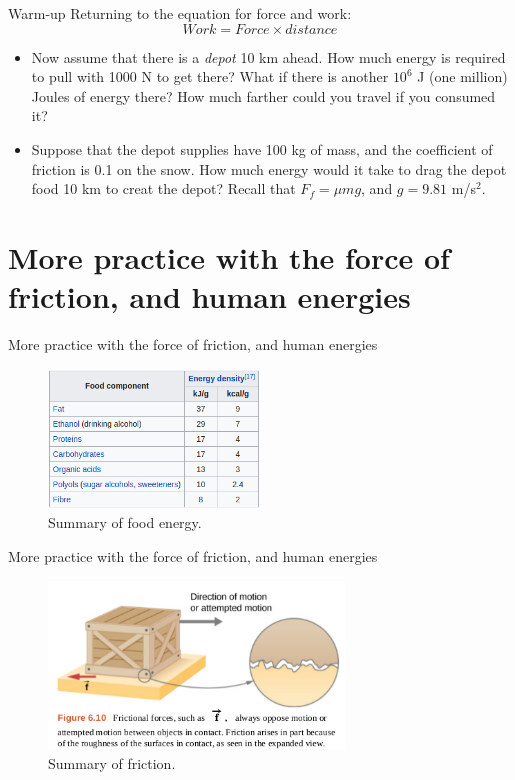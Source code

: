 \documentclass{beamer}
\begin{document}
\begin{frame}{Warm-up}
Returning to the equation for force and work:
\begin{equation}
Work = Force \times distance
\end{equation}
\begin{itemize}
\item Now assume that there is a \textit{depot} 10 km ahead.  How much energy is required to pull with 1000 N to get there?  What if there is another $10^{6}$ J (one million) Joules of energy there?  How much farther could you travel if you consumed it?
\item Suppose that the depot supplies have 100 kg of mass, and the coefficient of friction is 0.1 on the snow.  How much energy would it take to drag the depot food 10 km to creat the depot?  Recall that $F_f = \mu m g$, and $g = 9.81$ m/s$^2$.
\end{itemize}
\end{frame}

\section{More practice with the force of friction, and human energies}

\begin{frame}{More practice with the force of friction, and human energies}
\begin{figure}
\centering
\includegraphics[width=0.5\textwidth]{calories.png}
\caption{\label{fig:cal} Summary of food energy.}
\end{figure}
\end{frame}

\begin{frame}{More practice with the force of friction, and human energies}
\begin{figure}
\centering
\includegraphics[width=0.7\textwidth]{friction.png}
\caption{\label{fig:f} Summary of friction.}
\end{figure}
\end{frame}
\end{document}
